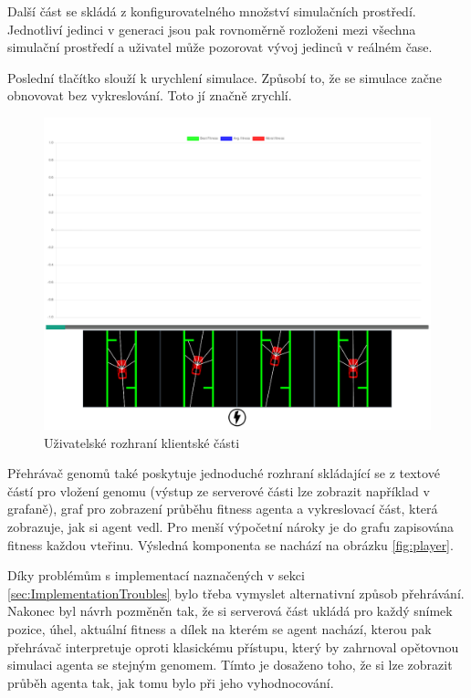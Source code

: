 Další část se skládá z konfigurovatelného množství simulačních prostředí. Jednotliví jedinci v generaci jsou pak rovnoměrně rozloženi mezi všechna simulační prostředí a uživatel může pozorovat vývoj jedinců v reálném čase.

Poslední tlačítko slouží k urychlení simulace. Způsobí to, že se simulace začne obnovovat bez vykreslování. Toto jí značně zrychlí.

\begin{figure}[h!]
	\centering
	\includegraphics[width=0.6\linewidth]{visualization}
	\caption{Uživatelské rozhraní klientské části}
	\label{fig:visualization}
\end{figure}

Přehrávač genomů také poskytuje jednoduché rozhraní skládající se z textové částí pro vložení genomu (výstup ze serverové části lze zobrazit například v grafaně), graf pro zobrazení průběhu fitness agenta a vykreslovací část, která zobrazuje, jak si agent vedl. Pro menší výpočetní nároky je do grafu zapisována fitness každou vteřinu.  Výsledná komponenta se nachází na obrázku \ref{fig:player}.

Díky problémům s implementací naznačených v sekci \ref{sec:ImplementationTroubles} bylo třeba vymyslet alternativní způsob přehrávání. Nakonec byl návrh pozměněn tak, že si serverová část ukládá pro každý snímek pozice, úhel, aktuální fitness a dílek na kterém se agent nachází, kterou pak přehrávač interpretuje oproti klasickému přístupu, který by zahrnoval opětovnou simulaci agenta se stejným genomem. Tímto je dosaženo toho, že si lze zobrazit průběh agenta tak, jak tomu bylo při jeho vyhodnocování.

